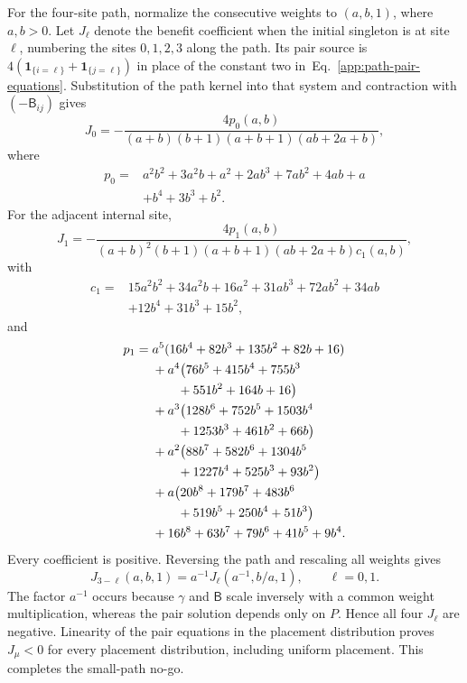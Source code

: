 \documentclass[aps,pre,reprint,amsmath,amssymb,longbibliography]{revtex4-2}
\begin{document}
For the four-site path, normalize the consecutive weights to $(a,b,1)$,
where $a,b>0$. Let $J_\ell$ denote the benefit coefficient when the
initial singleton is at site $\ell$, numbering the sites $0,1,2,3$ along
the path. Its pair source is
$4(\mathbf1_{\{i=\ell\}}+\mathbf1_{\{j=\ell\}})$ in place of the
constant two in~Eq.~\eqref{app:path-pair-equations}. Substitution of the path
kernel into that system and contraction with $(-\mathsf B_{ij})$ gives
\begin{equation}
 J_0=-\frac{4p_0(a,b)}
 {(a+b)(b+1)(a+b+1)(ab+2a+b)},
 \label{app:path-p4-endpoint}
\end{equation}
where
\begin{equation}
 \begin{split}
 p_0={}&a^2b^2+3a^2b+a^2+2ab^3+7ab^2+4ab+a\\
      &+b^4+3b^3+b^2.
 \end{split}
 \label{app:path-p4-endpoint-polynomial}
\end{equation}
For the adjacent internal site,
\begin{equation}
 J_1=-\frac{4p_1(a,b)}
 {(a+b)^2(b+1)(a+b+1)(ab+2a+b)c_1(a,b)},
 \label{app:path-p4-internal}
\end{equation}
with
\begin{equation}
 \begin{split}
 c_1={}&15a^2b^2+34a^2b+16a^2+31ab^3+72ab^2+34ab\\
      &+12b^4+31b^3+15b^2,
 \end{split}
 \label{app:path-p4-denominator-polynomial}
\end{equation}
and
\begin{align}
 p_1={}&a^5(16b^4+82b^3+135b^2+82b+16)\notag\\
 &+a^4\bigl(76b^5+415b^4+755b^3\notag\\
 &\qquad+551b^2+164b+16\bigr)\notag\\
 &+a^3\bigl(128b^6+752b^5+1503b^4\notag\\
 &\qquad+1253b^3+461b^2+66b\bigr)\notag\\
 &+a^2\bigl(88b^7+582b^6+1304b^5\notag\\
 &\qquad+1227b^4+525b^3+93b^2\bigr)\notag\\
 &+a\bigl(20b^8+179b^7+483b^6\notag\\
 &\qquad+519b^5+250b^4+51b^3\bigr)\notag\\
 &+16b^8+63b^7+79b^6+41b^5+9b^4.
 \label{app:path-p4-internal-polynomial}
\end{align}
Every coefficient is positive. Reversing the path and rescaling all
weights gives
\begin{equation}
 J_{3-\ell}(a,b,1)=a^{-1}J_\ell(a^{-1},b/a,1),
 \qquad \ell=0,1.
 \label{app:path-p4-reversal}
\end{equation}
The factor $a^{-1}$ occurs because $\gamma$ and $\mathsf B$ scale inversely with a
common weight multiplication, whereas the pair solution depends only
on $P$. Hence all four $J_\ell$ are negative. Linearity of the pair
equations in the placement distribution proves $J_\mu<0$ for every placement distribution,
including uniform placement. This completes the small-path no-go.
\end{document}
